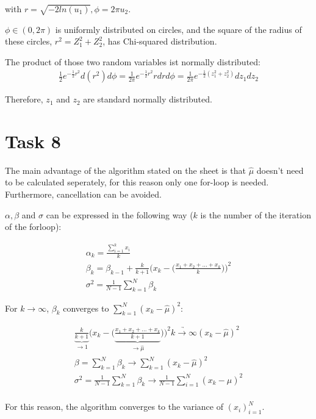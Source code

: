 \documentclass[10pt,a4paper]{article}
\begin{document}
with $r=\sqrt{-2ln(u_1)}, \phi=2\pi u_2$. 

$\phi\in (0,2\pi)$ is uniformly distributed on circles, and the square of the radius of these circles, $r^2=Z_1^2+Z_2^2$, has Chi-squared distribution.

The product of those two random variables ist normally distributed:
\begin{align*}
\frac{1}{2}e^{-\frac{1}{2}r^2}d(r^2)d\phi = \frac{1}{2\pi}e^{-\frac{1}{2}r^2}rdrd\phi = \frac{1}{2\pi}e^{-\frac{1}{2}(z_1^2+z_2^2)}dz_1dz_2
\end{align*} 

Therefore, $z_1$ and $z_2$ are standard normally distributed.

\section*{Task 8}

The main advantage of the algorithm stated on the sheet is that $\hat{\mu}$ doesn't need to be calculated seperately, for this reason only one for-loop is needed. Furthermore, cancellation can be avoided.

$\alpha, \beta$ and $\sigma$ can be expressed in the following way ($k$ is the number of the iteration of the forloop):

\begin{gather*}
\alpha_k = \frac{\sum_{i=1}^k x_i}{k} \\
\beta_k = \beta_{k-1}+\frac{k}{k+1}\bigg(x_k-\bigg(\frac{x_1+x_2+...+x_{k}}{k}\bigg)\bigg)^2 \\
\sigma^2 = \frac{1}{N-1}\sum_{k=1}^N\beta_k
\end{gather*}

For $k \to \infty$, $\beta_k$ converges to $\sum_{k=1}^N (x_k-\hat{\mu})^2$:

\begin{gather*}
\underbrace{\frac{k}{k+1}}_{\to 1}\bigg(x_k-\bigg(\underbrace{\frac{x_1+x_2+...+x_{k}}{k+1}}_{\to \hat{\mu}}\bigg)\bigg)^2 \underrightarrow{k\to\infty} (x_k-\hat{\mu})^2 \\
\beta = \sum_{k=1}^N \beta_k \to \sum_{k=1}^N (x_k-\hat{\mu})^2 \\
\sigma^2 = \frac{1}{N-1}\sum_{k=1}^N\beta_k \to \frac{1}{N-1} \sum_{i=1}^N (x_k-\hat{\mu})^2 \\
\end{gather*}

For this reason, the algorithm converges to the variance of $(x_i)_{i=1}^N$.
\end{document}
